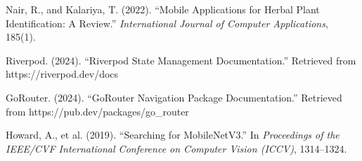 \documentclass[12pt]{article}
\begin{document}
\begin{enumerate}[leftmargin=*, label={[\arabic*]}]
    \item Nair, R., and Kalariya, T. (2022). ``Mobile Applications for Herbal Plant
    Identification: A Review.'' \textit{International Journal of Computer Applications}, 185(1).

    \item Riverpod. (2024). ``Riverpod State Management Documentation.''
    Retrieved from https://riverpod.dev/docs

    \item GoRouter. (2024). ``GoRouter Navigation Package Documentation.''
    Retrieved from https://pub.dev/packages/go\_router

    \item Howard, A., et al. (2019). ``Searching for MobileNetV3.'' In \textit{Proceedings of the
    IEEE/CVF International Conference on Computer Vision (ICCV)}, 1314--1324.

\end{enumerate}
\end{document}

